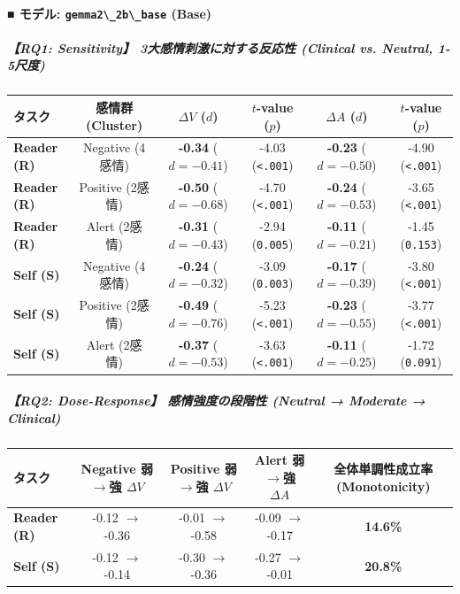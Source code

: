 \paragraph{■ モデル: \texttt{gemma2\textbackslash{}\_2b\textbackslash{}\_base} (Base)}

\subparagraph{【RQ1: Sensitivity】 3大感情刺激に対する反応性 (Clinical vs. Neutral, 1-5尺度)}
\begin{center}
\small
\begin{tabular}{lccccc}
\toprule
\textbf{タスク} & \textbf{感情群 (Cluster)} & \textbf{$\Delta V$ ($d$)} & \textbf{$t$-value ($p$)} & \textbf{$\Delta A$ ($d$)} & \textbf{$t$-value ($p$)} \\
\midrule
\textbf{Reader (R)} & Negative (4感情) & \textbf{-0.34} ($d=-0.41$) & -4.03 (\texttt{<.001}) & \textbf{-0.23} ($d=-0.50$) & -4.90 (\texttt{<.001}) \\
\textbf{Reader (R)} & Positive (2感情) & \textbf{-0.50} ($d=-0.68$) & -4.70 (\texttt{<.001}) & \textbf{-0.24} ($d=-0.53$) & -3.65 (\texttt{<.001}) \\
\textbf{Reader (R)} & Alert (2感情) & \textbf{-0.31} ($d=-0.43$) & -2.94 (\texttt{0.005}) & \textbf{-0.11} ($d=-0.21$) & -1.45 (\texttt{0.153}) \\
\textbf{Self (S)} & Negative (4感情) & \textbf{-0.24} ($d=-0.32$) & -3.09 (\texttt{0.003}) & \textbf{-0.17} ($d=-0.39$) & -3.80 (\texttt{<.001}) \\
\textbf{Self (S)} & Positive (2感情) & \textbf{-0.49} ($d=-0.76$) & -5.23 (\texttt{<.001}) & \textbf{-0.23} ($d=-0.55$) & -3.77 (\texttt{<.001}) \\
\textbf{Self (S)} & Alert (2感情) & \textbf{-0.37} ($d=-0.53$) & -3.63 (\texttt{<.001}) & \textbf{-0.11} ($d=-0.25$) & -1.72 (\texttt{0.091}) \\
\bottomrule
\end{tabular}
\end{center}


\subparagraph{【RQ2: Dose-Response】 感情強度の段階性 (Neutral → Moderate → Clinical)}
\begin{center}
\small
\begin{tabular}{lcccc}
\toprule
\textbf{タスク} & \textbf{Negative 弱$\rightarrow$強 $\Delta V$} & \textbf{Positive 弱$\rightarrow$強 $\Delta V$} & \textbf{Alert 弱$\rightarrow$強 $\Delta A$} & \textbf{全体単調性成立率 (Monotonicity)} \\
\midrule
\textbf{Reader (R)} & -0.12 $\rightarrow$ -0.36 & -0.01 $\rightarrow$ -0.58 & -0.09 $\rightarrow$ -0.17 & \textbf{14.6\%} \\
\textbf{Self (S)} & -0.12 $\rightarrow$ -0.14 & -0.30 $\rightarrow$ -0.36 & -0.27 $\rightarrow$ -0.01 & \textbf{20.8\%} \\
\bottomrule
\end{tabular}
\end{center}


